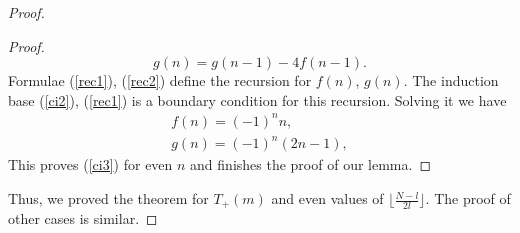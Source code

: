\documentclass[11pt]{amsart}
\begin{document}
\begin{proof}
\begin{proof}
		\begin{equation}\label{rec2}
		g(n)=g(n-1)-4f(n-1).
		\end{equation}
		Formulae (\ref{rec1}), (\ref{rec2}) define the recursion for $f(n)$, $g(n)$. The induction base (\ref{ci2}), (\ref{rec1})
		is a boundary condition for this recursion.  Solving it we have
		\begin{eqnarray*}
		f(n)=(-1)^n n,\\
		g(n)=(-1)^{n}(2n-1),
		\end{eqnarray*}
		This proves (\ref{ci3}) for even $n$ and finishes the proof of our lemma.
	\end{proof}
	Thus, we proved the theorem for $T_{+}(m)$ and even values of $\lfloor\frac{N-l}{2l}\rfloor$.
	The proof of other cases is similar. 
\end{proof}
\end{document}
